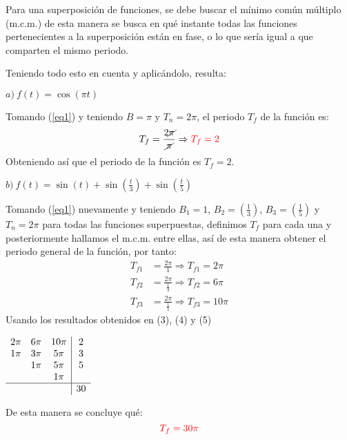 \begin{multicols}{2}
Para una superposición de funciones, se debe buscar el mínimo común múltiplo (m.c.m.) de esta manera se busca en qué instante todas las funciones pertenecientes a la superposición están en fase, o lo que sería igual a que comparten el mismo periodo.

Teniendo todo esto en cuenta y aplicándolo, resulta:

$a) ~ f(t) = \cos \left(\pi t\right)$

Tomando (\ref{eq1}) y teniendo $B = \pi$ y $T_n = 2\pi$, el periodo $T_f$ de la función es:
\begin{equation}
    T_f = \frac{2 \cancel{\pi}}{\cancel{\pi}} \Rightarrow \textcolor{rojo}{T_f = 2}
    \label{res1}
\end{equation}
Obteniendo así que el periodo de la función es \textcolor{rojo}{$T_f = 2$}.

$b) ~ f(t) = \sin \left(t\right) + \sin \left(\frac{t}{3}\right) + \sin \left(\frac{t}{5}\right)$

Tomando (\ref{eq1}) nuevamente y teniendo $B_1 = 1$, $B_2 = \left(\frac{1}{3}\right)$, $B_3 = \left(\frac{1}{5}\right)$ y $T_n = 2\pi$ para todas las funciones superpuestas, definimos $T_f$ para cada una y posteriormente hallamos el m.c.m. entre ellas, así de esta manera obtener el periodo general de la función, por tanto:
\begin{align}
    T_{f1} & = \frac{2\pi}{1} \Rightarrow T_{f1} = 2\pi \\
    T_{f2} & = \frac{2\pi}{ \frac{1}{3} } \Rightarrow T_{f2} = 6\pi \\
    T_{f3} & = \frac{2\pi}{ \frac{1}{5} } \Rightarrow T_{f3} = 10\pi
\end{align}
Usando los resultados obtenidos en (3), (4) y (5)
\begin{center}

$\begin{array}{c c c | c}
    2\pi & 6\pi & 10\pi & 2\\
    1\pi & 3\pi & 5\pi & 3\\
    \hphantom{1\pi} & 1\pi & 5\pi & 5\\
    \hphantom{1\pi} & \hphantom{1\pi} & 1\pi & \hphantom{1}\\ \hline
    \hphantom{1\pi} & \hphantom{1\pi} & \hphantom{1\pi} & 30
\end{array}$

\end{center}
De esta manera se concluye qué:
\begin{equation}
    \textcolor{rojo}{T_f = 30\pi}
\label{res2}
\end{equation}


\end{multicols}
